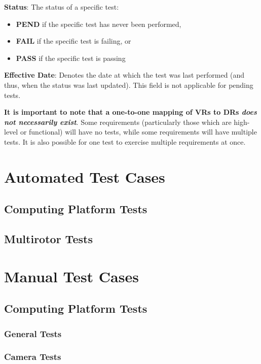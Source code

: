 \documentclass[10pt,letterpaper]{article}
\begin{document}
\textbf{Status}: The status of a specific test:
\begin{itemize}
	\item \textbf{PEND} if the specific test has never been performed,
	\item \textbf{FAIL} if the specific test is failing, or
	\item \textbf{PASS} if the specific test is passing
\end{itemize}

\textbf{Effective Date}: Denotes the date at which the test was last performed (and thus, when the status was last updated). This field is not applicable for pending tests.

\textbf{It is important to note that a one-to-one mapping of VRs to DRs \textit{does not necessarily exist}}. Some requirements (particularly those which are high-level or functional) will have no tests, while some requirements will have multiple tests. It is also possible for one test to exercise multiple requirements at once.

\section{Automated Test Cases}

\subsection{Computing Platform Tests}

\subsection{Multirotor Tests}

\section{Manual Test Cases}

\subsection{Computing Platform Tests}
\subsubsection{General Tests}

\subsubsection{Camera Tests}
\end{document}
